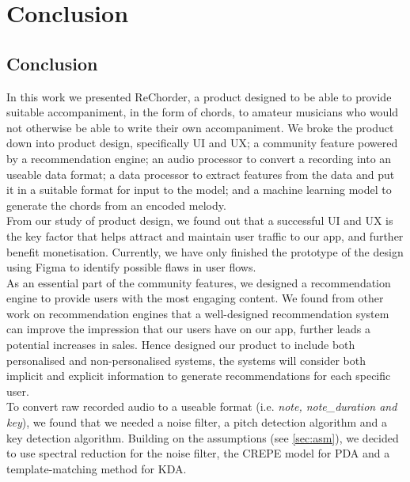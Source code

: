 


\chapter{Conclusion} %
\label{Conclusion} %

\section{Conclusion}

In this work we presented ReChorder, a product designed to be able to provide suitable accompaniment, in the form of chords, to amateur musicians who would not otherwise be able to write their own accompaniment.
We broke the product down into 
product design, specifically UI and UX; 
a community feature powered by a recommendation engine; 
an audio processor to convert a recording into an useable data format; 
a data processor to extract features from the data and put it in a suitable format for input to the model;
and a machine learning model to generate the chords from an encoded melody. 
\\
From our study of product design, we found out that a successful UI and UX is the key factor that helps attract and maintain user traffic to our app, and further benefit monetisation. 
Currently, we have only finished the prototype of the design using Figma to identify possible flaws in user flows. 
\\
As an essential part of the community features, we designed a recommendation engine to provide users with the most engaging content.
We found from other work on recommendation engines that a well-designed recommendation system can improve the impression that our users have on our app, further leads a potential increases in sales.
Hence designed our product to include both personalised and non-personalised systems, the systems will consider both implicit and explicit information to 
generate recommendations for each specific user.
\\
To convert raw recorded audio to a useable format (i.e. \emph{note, note\_duration and key}), we found that we needed a noise filter, a pitch detection algorithm and a key detection algorithm. 
Building on the assumptions (see \cref{sec:asm}), we decided to use spectral reduction for the noise filter, the CREPE model for PDA and a template-matching method for KDA.
